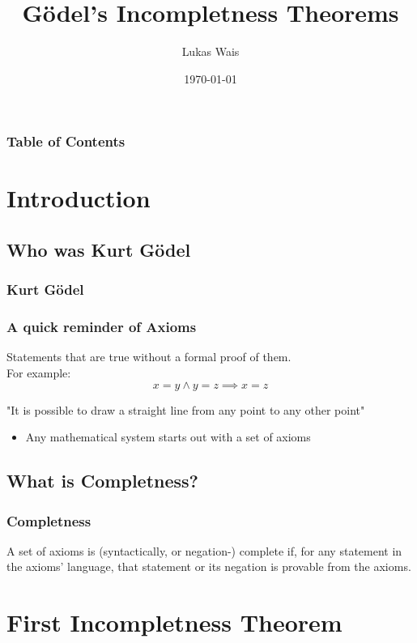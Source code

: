 \documentclass[aspectratio=169]{beamer}
\title{Gödel's Incompletness Theorems}
\author{Lukas Wais}
\institute{Special Topics Course 326.901}
\date{\today}
\begin{document}
\frame{\titlepage}
\begin{frame}
	\frametitle{Table of Contents}
	\tableofcontents
\end{frame}
\section{Introduction}
\subsection{Who was Kurt Gödel}
\begin{frame}
	\frametitle{Kurt Gödel}
\end{frame}
\begin{frame}
	\frametitle{A quick reminder of Axioms}
	 \begin{Definition}[Axiom]
	 	Statements that are true without a formal proof of them. \\ For example:
	 	\[x = y \land y = z \implies x = z\]
	  	\begin{center}
	  		"It is possible to draw a straight line from any point to any other point"
	  	\end{center}
	 \end{Definition}
	 \begin{itemize}
	 	\item Any mathematical system starts out with a set of axioms
	 \end{itemize}
\end{frame}
\subsection{What is Completness?}
\begin{frame}
	\frametitle{Completness}
	 \begin{Definition}[Complete]
	 	A set of axioms is (syntactically, or negation-) complete if, for any statement in the axioms' language, that statement or its negation is provable from the axioms. \cite{smith}
	 \end{Definition}
\end{frame}
\section{First Incompletness Theorem}
\end{document}
